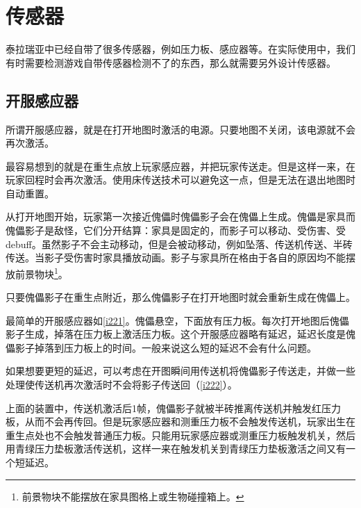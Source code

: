 \section{传感器}
泰拉瑞亚中已经自带了很多传感器，例如压力板、感应器等。在实际使用中，我们有时需要检测游戏自带传感器检测不了的东西，那么就需要另外设计传感器。

\subsection{开服感应器}
所谓开服感应器，就是在打开地图时激活的电源。只要地图不关闭，该电源就不会再次激活。

最容易想到的就是在重生点放上玩家感应器，并把玩家传送走。但是这样一来，在玩家回程时会再次激活。使用床传送技术可以避免这一点，但是无法在退出地图时自动重置。

从打开地图开始，玩家第一次接近傀儡时傀儡影子会在傀儡上生成。傀儡是家具而傀儡影子是敌怪，它们分开结算：家具是固定的，而影子可以移动、受伤害、受debuff。虽然影子不会主动移动，但是会被动移动，例如坠落、传送机传送、半砖传送。当影子受伤害时家具播放动画。影子与家具所在格由于各自的原因均不能摆放前景物块\footnote{前景物块不能摆放在家具图格上或生物碰撞箱上。}。

只要傀儡影子在重生点附近，那么傀儡影子在打开地图时就会重新生成在傀儡上。

最简单的开服感应器如\autoref{i221}。傀儡悬空，下面放有压力板。每次打开地图后傀儡影子生成，掉落在压力板上激活压力板。这个开服感应器略有延迟，延迟长度是傀儡影子掉落到压力板上的时间。一般来说这么短的延迟不会有什么问题。

\begin{figure}[!ht]
\centering
{}
\caption{}
\label{i221}
\end{figure}

如果想要更短的延迟，可以考虑在开图瞬间用传送机将傀儡影子传送走，并做一些处理使传送机再次激活时不会将影子传送回（\autoref{i222}）。

\begin{figure}[!ht]
\centering
{}
\caption{}
\label{i222}
\end{figure}

上面的装置中，传送机激活后1帧，傀儡影子就被半砖推离传送机并触发红压力板，从而不会再传回。但是玩家感应器和测重压力板不会触发传送机，玩家出生在重生点处也不会触发普通压力板。只能用玩家感应器或测重压力板触发机关，然后用青绿压力垫板激活传送机，这样一来在触发机关到青绿压力垫板激活之间又有一个短延迟。

